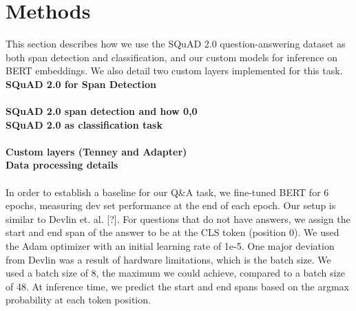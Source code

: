 \section{Methods}

This section describes how we use the SQuAD 2.0 question-answering dataset as both span detection and classification, and our custom models for inference on BERT embeddings. We also detail two custom layers implemented for this task. \\

\noindent
\textbf{SQuAD 2.0 for Span Detection} \\ \\

\noindent
\textbf{SQuAD 2.0 span detection and how 0,0} \\
\textbf{SQuAD 2.0 as classification task} \\ \\

\noindent
\textbf{Custom layers (Tenney and Adapter)} \\
\textbf{Data processing details} \\ \\

In order to establish a baseline for our Q\&A task, we fine-tuned BERT for 6 epochs, measuring dev set performance at the end of each epoch. Our setup is similar to Devlin et. al. [?]. For questions that do not have answers, we assign the start and end span of the answer to be at the CLS token (position 0). We used the Adam optimizer with an initial learning rate of 1e-5. One major deviation from Devlin was a result of hardware limitations, which is the batch size. We used a batch size of 8, the maximum we could achieve, compared to a batch size of 48. At inference time, we predict the start and end spans based on the argmax probability at each token position. \\

